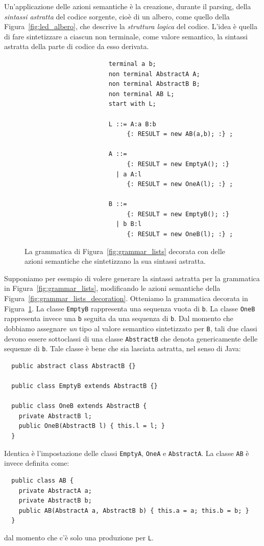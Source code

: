 Un'applicazione delle azioni semantiche \`e la creazione, durante il
parsing, della \emph{sintassi astratta}
del codice sorgente, cio\`e di un albero,
come quello della Figura~\ref{fig:led_albero}, che descrive la \emph{struttura
logica} del codice. L'idea \`e quella di fare
sintetizzare a ciascun non terminale, come valore semantico, la sintassi
astratta della parte di codice da esso derivata.

\begin{figure}[t]
\begin{verbatim}
                       terminal a b;
                       non terminal AbstractA A;
                       non terminal AbstractB B;
                       non terminal AB L;
                       start with L;

                       L ::= A:a B:b
                            {: RESULT = new AB(a,b); :} ;

                       A ::=
                            {: RESULT = new EmptyA(); :}
                         | a A:l
                            {: RESULT = new OneA(l); :} ;

                       B ::=
                            {: RESULT = new EmptyB(); :}
                         | b B:l
                            {: RESULT = new OneB(l); :} ;
\end{verbatim}
\caption{La grammatica di Figura~\ref{fig:grammar_lists} decorata con delle
         azioni semantiche che sintetizzano la sua sintassi astratta.}
  \label{fig:grammar_lists_abstract_syntax}
\end{figure}

Supponiamo per esempio di volere generare la sintassi astratta per la
grammatica in Figura~\ref{fig:grammar_lists}, modificando le azioni semantiche
della Figura~\ref{fig:grammar_lists_decoration}. Otteniamo la grammatica
decorata in Figura~\ref{fig:grammar_lists_abstract_syntax}.
La classe \texttt{EmptyB} rappresenta una sequenza vuota di \texttt{b}.
La classe \texttt{OneB} rappresenta invece una \texttt{b} seguita da una
sequenza di \texttt{b}. Dal momento che dobbiamo assegnare \emph{un} tipo
al valore semantico sintetizzato per \texttt{B}, tali due classi devono
essere sottoclassi di una classe \texttt{AbstractB} che denota
genericamente delle sequenze di \texttt{b}. Tale classe \`e bene che
sia lasciata astratta, nel senso di Java:
%
\begin{verbatim}
  public abstract class AbstractB {}

  public class EmptyB extends AbstractB {}

  public class OneB extends AbstractB {
    private AbstractB l;
    public OneB(AbstractB l) { this.l = l; }
  }
\end{verbatim}
%
Identica \`e l'impostazione delle classi \texttt{EmptyA},
\texttt{OneA} e \texttt{AbstractA}. La classe \texttt{AB} \`e invece definita
come:
%
\begin{verbatim}
  public class AB {
    private AbstractA a;
    private AbstractB b;
    public AB(AbstractA a, AbstractB b) { this.a = a; this.b = b; }
  }
\end{verbatim}
%
dal momento che c'\`e solo una produzione per \texttt{L}.

